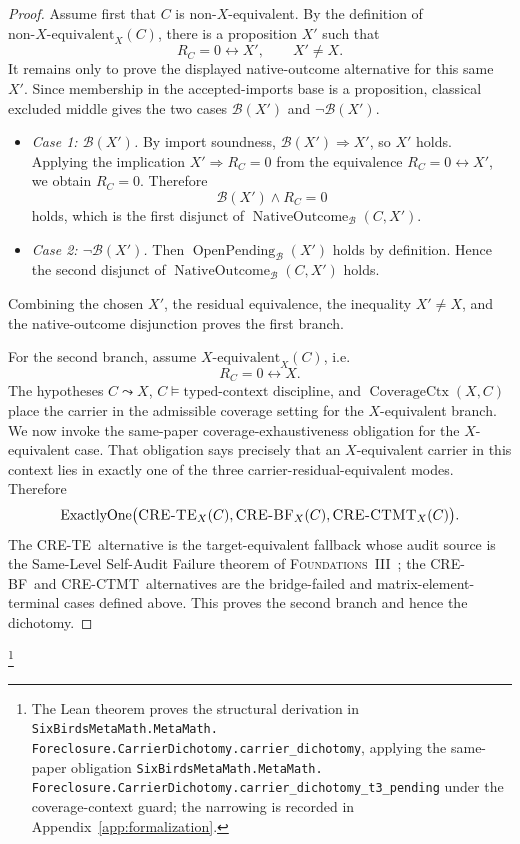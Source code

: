 \documentclass[11pt]{article}
\newcommand{\FThree}{\textsc{Foundations~III}}
\newcommand{\Xequiv}{$X$-equivalent}
\newcommand{\nonXequiv}{non-$X$-equivalent}
\newcommand{\CRETE}{\textsc{CRE-TE}}
\newcommand{\CREBF}{\textsc{CRE-BF}}
\newcommand{\CRECTMT}{\textsc{CRE-CTMT}}
\newcommand{\TCD}{typed-context discipline}
\theoremstyle{definition}
\begin{document}
\begin{proof}
Assume first that \(C\) is \nonXequiv.  By the definition of
\(\mbox{\nonXequiv}_X(C)\), there is a proposition \(X'\) such that
\[
  R_C=0\leftrightarrow X',
  \qquad
  X'\neq X .
\]
It remains only to prove the displayed native-outcome alternative for
this same \(X'\).  Since membership in the accepted-imports base is a
proposition, classical excluded middle gives the two cases
\(\mathcal B(X')\) and \(\neg\mathcal B(X')\).
\begin{itemize}
\item \emph{Case 1: \(\mathcal B(X')\).}  By import soundness,
  \(\mathcal B(X')\Rightarrow X'\), so \(X'\) holds.  Applying the
  implication \(X'\Rightarrow R_C=0\) from the equivalence
  \(R_C=0\leftrightarrow X'\), we obtain \(R_C=0\).  Therefore
  \[
    \mathcal B(X')\wedge R_C=0
  \]
  holds, which is the first disjunct of
  \(\operatorname{NativeOutcome}_{\mathcal B}(C,X')\).
\item \emph{Case 2: \(\neg\mathcal B(X')\).}  Then
  \(\operatorname{OpenPending}_{\mathcal B}(X')\) holds by definition.
  Hence the second disjunct of
  \(\operatorname{NativeOutcome}_{\mathcal B}(C,X')\) holds.
\end{itemize}
Combining the chosen \(X'\), the residual equivalence, the inequality
\(X'\neq X\), and the native-outcome disjunction proves the first
branch.

For the second branch, assume \(\mbox{\Xequiv}_X(C)\), i.e.
\[
  R_C=0\leftrightarrow X .
\]
The hypotheses \(C\leadsto X\), \(C\models\text{\TCD}\), and
\(\operatorname{CoverageCtx}(X,C)\) place the carrier in the admissible
coverage setting for the \(X\)-equivalent branch.  We now invoke the
same-paper coverage-exhaustiveness obligation for the
\(X\)-equivalent case.  That obligation says precisely that an
\(X\)-equivalent carrier in this context lies in exactly one of the
three carrier-residual-equivalent modes.  Therefore
\[
  \operatorname{ExactlyOne}\bigl(
    \mbox{\CRETE}_X(C),\mbox{\CREBF}_X(C),\mbox{\CRECTMT}_X(C)
  \bigr).
\]
The \CRETE\ alternative is the target-equivalent fallback whose audit
source is the Same-Level Self-Audit Failure theorem of
\FThree\ \cite{Tsiokos2026FoundationsIII}; the \CREBF\ and \CRECTMT\
alternatives are the bridge-failed and matrix-element-terminal cases
defined above.  This proves the second branch and hence the dichotomy.
\end{proof}\footnote{\raggedright The Lean theorem proves the structural
derivation in \texttt{SixBirdsMetaMath.MetaMath.\allowbreak
Foreclosure.CarrierDichotomy.\allowbreak carrier\_dichotomy}, applying
the same-paper obligation \texttt{SixBirdsMetaMath.MetaMath.\allowbreak
Foreclosure.CarrierDichotomy.\allowbreak carrier\_dichotomy\_t3\_pending}
under the coverage-context guard; the narrowing is recorded in
Appendix~\ref{app:formalization}.}
\end{document}
